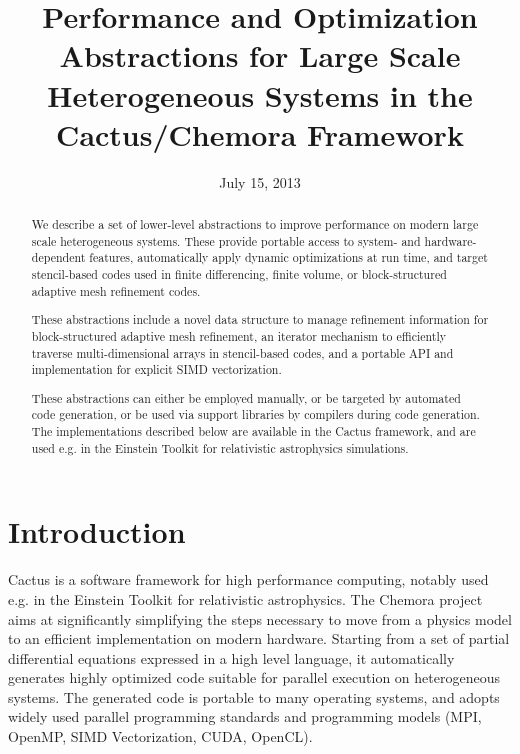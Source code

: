 \documentclass[conference]{IEEEtran}
\begin{document}
\title{Performance and Optimization Abstractions for Large Scale
  Heterogeneous Systems in the Cactus/Chemora Framework}

\author{
}

\date{July 15, 2013}

\maketitle

\begin{abstract}
  We describe a set of lower-level abstractions to improve performance
  on modern large scale heterogeneous systems. These provide portable
  access to system- and hardware-dependent features, automatically
  apply dynamic optimizations at run time, and target
  stencil-based codes used in finite differencing, finite volume,
  or block-structured adaptive mesh refinement codes.
  
  These abstractions include a novel data structure to manage
  refinement information for block-structured adaptive mesh
  refinement, an iterator mechanism to efficiently traverse
  multi-dimensional arrays in stencil-based codes, and a portable API
  and implementation for explicit SIMD vectorization.
  
  These abstractions can either be employed manually, or be targeted
  by automated code generation, or be used via support libraries by
  compilers during code generation. The implementations described
  below are available in the Cactus framework, and are used e.g. in
  the Einstein Toolkit for relativistic astrophysics simulations.
\end{abstract}



\section{Introduction}

Cactus \cite{Goodale:2002a, Cactuscode:web} is a software framework
for high performance computing, notably used e.g. in the Einstein
Toolkit \cite{Loffler:2011ay, EinsteinToolkit:web} for relativistic
astrophysics. The Chemora project \cite{Blazewicz2011}
 aims at significantly
simplifying the steps necessary to move from a physics model to an
efficient implementation on modern hardware. Starting from a set of
partial differential equations expressed in a high level language, it
automatically generates highly optimized code suitable for parallel
execution on heterogeneous systems. The generated code is portable to
many operating systems, and adopts widely used parallel programming
standards and programming models (MPI, OpenMP, SIMD Vectorization,
CUDA, OpenCL).
\end{document}
